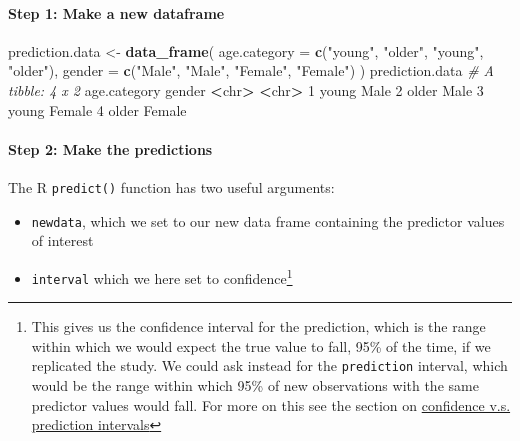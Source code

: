 \documentclass[]{article}
\newenvironment{Shaded}{\begin{snugshade}}{\end{snugshade}}
\newcommand{\CommentTok}[1]{\textcolor[rgb]{0.56,0.35,0.01}{\textit{#1}}}
\newcommand{\DataTypeTok}[1]{\textcolor[rgb]{0.13,0.29,0.53}{#1}}
\newcommand{\DecValTok}[1]{\textcolor[rgb]{0.00,0.00,0.81}{#1}}
\newcommand{\ErrorTok}[1]{\textcolor[rgb]{0.64,0.00,0.00}{\textbf{#1}}}
\newcommand{\KeywordTok}[1]{\textcolor[rgb]{0.13,0.29,0.53}{\textbf{#1}}}
\newcommand{\NormalTok}[1]{#1}
\newcommand{\OperatorTok}[1]{\textcolor[rgb]{0.81,0.36,0.00}{\textbf{#1}}}
\newcommand{\StringTok}[1]{\textcolor[rgb]{0.31,0.60,0.02}{#1}}
\providecommand{\tightlist}{%
  \setlength{\itemsep}{0pt}\setlength{\parskip}{0pt}}
\let\oldparagraph\paragraph
\renewcommand{\paragraph}[1]{\oldparagraph{#1}\mbox{}}
\let\rmarkdownfootnote\footnote%
\def\footnote{\protect\rmarkdownfootnote}
\begin{document}
\hypertarget{step-1-make-a-new-dataframe}{%
\paragraph{Step 1: Make a new dataframe}\label{step-1-make-a-new-dataframe}}

\begin{Shaded}
\begin{Highlighting}[]
\NormalTok{prediction.data <-}\StringTok{ }\KeywordTok{data_frame}\NormalTok{(}
  \DataTypeTok{age.category =} \KeywordTok{c}\NormalTok{(}\StringTok{"young"}\NormalTok{, }\StringTok{"older"}\NormalTok{, }\StringTok{"young"}\NormalTok{, }\StringTok{"older"}\NormalTok{),}
  \DataTypeTok{gender =} \KeywordTok{c}\NormalTok{(}\StringTok{"Male"}\NormalTok{, }\StringTok{"Male"}\NormalTok{, }\StringTok{"Female"}\NormalTok{, }\StringTok{"Female"}\NormalTok{)}
\NormalTok{)}
\NormalTok{prediction.data}
\CommentTok{# A tibble: 4 x 2}
\NormalTok{  age.category gender}
  \OperatorTok{<}\NormalTok{chr}\OperatorTok{>}\StringTok{        }\ErrorTok{<}\NormalTok{chr}\OperatorTok{>}\StringTok{ }
\DecValTok{1}\NormalTok{ young        Male  }
\DecValTok{2}\NormalTok{ older        Male  }
\DecValTok{3}\NormalTok{ young        Female}
\DecValTok{4}\NormalTok{ older        Female}
\end{Highlighting}
\end{Shaded}

\hypertarget{step-2-make-the-predictions}{%
\paragraph{Step 2: Make the predictions}\label{step-2-make-the-predictions}}

The R \texttt{predict()} function has two useful arguments:

\begin{itemize}
\tightlist
\item
  \texttt{newdata}, which we set to our new data frame containing the predictor
  values of interest
\item
  \texttt{interval} which we here set to confidence\footnote{This gives us the confidence
    interval for the prediction, which is the range within which we would expect
    the true value to fall, 95\% of the time, if we replicated the study. We
    could ask instead for the \texttt{prediction} interval, which would be the range
    within which 95\% of new observations with the same predictor values would
    fall. For more on this see the section on
    \href{confidence-vs-prediction-intervals.html}{confidence v.s. prediction intervals}}
\end{itemize}
\end{document}
